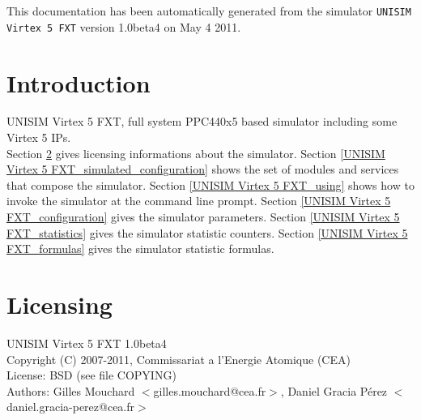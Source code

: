 This documentation has been automatically generated from the simulator \texttt{UNISIM Virtex 5 FXT} version 1.0beta4 on May  4 2011.
\section{Introduction}
UNISIM Virtex 5 FXT, full system PPC440x5 based simulator including some Virtex 5 IPs.\\
Section \ref{UNISIM Virtex 5 FXT_licensing} gives licensing informations about the simulator.
Section \ref{UNISIM Virtex 5 FXT_simulated_configuration} shows the set of modules and services that compose the simulator.
Section \ref{UNISIM Virtex 5 FXT_using} shows how to invoke the simulator at the command line prompt.
Section \ref{UNISIM Virtex 5 FXT_configuration} gives the simulator parameters.
Section \ref{UNISIM Virtex 5 FXT_statistics} gives the simulator statistic counters.
Section \ref{UNISIM Virtex 5 FXT_formulas} gives the simulator statistic formulas.
\section{Licensing}
\label{UNISIM Virtex 5 FXT_licensing}
UNISIM Virtex 5 FXT 1.0beta4\\
Copyright (C) 2007-2011, Commissariat a l'Energie Atomique (CEA)\\
License: BSD (see file COPYING)\\
Authors: Gilles Mouchard $<$gilles.mouchard@cea.fr$>$, Daniel Gracia P\'erez $<$daniel.gracia-perez@cea.fr$>$\\
